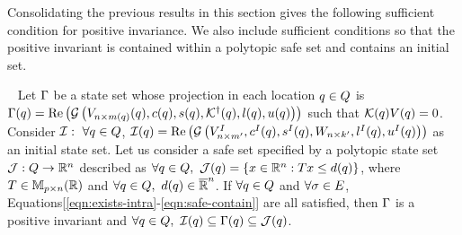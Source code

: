 Consolidating the previous results in this section gives the following
sufficient condition for positive invariance.  We also
include sufficient conditions so that the positive invariant is
contained within a polytopic safe set and contains an initial set.

\begin{theorem}~\label{thm:main} Let $\Gamma$ be a state set whose
  projection in each location $q\in Q$ is
  $\Gamma(q) = \operatorname{\operatorname{Re}}\left(\mathcal{G}\left(V_{n\times
      m(q)}(q),c(q),s(q),\mathcal{K}^\dagger(q),l(q),u(q)\right)\right)$
  such that $\mathcal{K}(q)V(q) = 0$.  Consider
  $\mathcal{I}:~\forall q\in Q$,
  $\mathcal{I}(q)=\operatorname{\operatorname{Re}}\left(\mathcal{G}\left(V^I_{n\times m^\prime
    },c^I(q),s^I(q),W_{n\times
      k^\prime},l^I(q),u^I(q)\right)\right)$ as an initial state set.  Let
  us consider a safe set specified by a polytopic state set
  $\mathcal{J}:Q\rightarrow\mathbb{R}^n$ described as $\forall
  q\in Q,~\mathcal{J}(q)=\left\{x\in\mathbb{R}^n:Tx\leq
  d(q)\right\}$, where $T\in\mathbb{M}_{p\times n}(\mathbb{R})$ and
  $\forall q\in Q,~d(q)\in\mathbb{\overline{R}}^n$.  If $\forall
  q\in Q$ and $\forall \sigma\in E$,
  Equations[\ref{eqn:exists-intra}-\ref{eqn:safe-contain}] are all
  satisfied, then $\Gamma$ is a positive invariant and $\forall
  q\in Q,~\mathcal{I}(q)\subseteq\Gamma(q)\subseteq
  \mathcal{J}(q)$.
\end{theorem}

